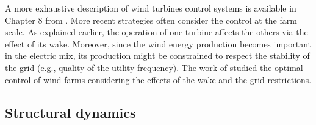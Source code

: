 A more exhaustive description of wind turbines control systems is available in Chapter 8 from \citet{burton_2021_wind_handbook}. 
More recent strategies often consider the control at the farm scale. 
As explained earlier, the operation of one turbine affects the others via the effect of its wake. 
Moreover, since the wind energy production becomes important in the electric mix, its production might be constrained to respect the stability of the grid (e.g., quality of the utility frequency).  
The work of \citet{gionfra_2018_control} studied the optimal control of wind farms considering the effects of the wake and the grid restrictions. 

\subsection{Structural dynamics}

